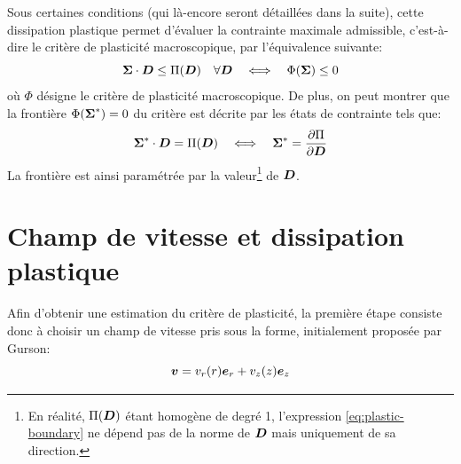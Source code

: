 \documentclass[french,12pt]{exam}
\begin{document}
Sous certaines conditions (qui là-encore seront détaillées dans la suite), cette dissipation plastique permet d'évaluer la contrainte maximale admissible, c'est-à-dire le critère de plasticité macroscopique, par l'équivalence suivante:
\begin{equation}
  \boldsymbol{\Sigma} \cdot \boldsymbol{D} \leq \Pi(\boldsymbol{D}) \quad \forall \boldsymbol{D} \quad \Longleftrightarrow \quad \Phi(\boldsymbol{\Sigma}) \leq 0 \label{eq2}
\end{equation}
où $\Phi$ désigne le critère de plasticité macroscopique. De plus, on peut montrer que la frontière $\Phi(\boldsymbol{\Sigma}^*)=0$ du critère est décrite par les états de contrainte tels que:
\begin{equation}
\boldsymbol{\Sigma}^*\cdot\boldsymbol{D} = \Pi(\boldsymbol{D}) \quad \Longleftrightarrow \quad \boldsymbol{\Sigma}^* = \dfrac{\partial \Pi}{\partial \boldsymbol{D}}
  \label{eq:plastic-boundary}
\end{equation}
La frontière est ainsi paramétrée par la valeur\footnote{En réalité, $\Pi(\boldsymbol{D})$ étant homogène de degré 1, l'expression \eqref{eq:plastic-boundary} ne dépend pas de la norme de $\boldsymbol{D}$ mais uniquement de sa direction.} de $\boldsymbol{D}$.

\section{Champ de vitesse et dissipation plastique}

Afin d'obtenir une estimation du critère de plasticité, la première étape consiste donc à choisir un champ de vitesse pris sous la forme, initialement proposée par Gurson:
\begin{equation}
  \boldsymbol{v} = v_r(r) \boldsymbol{e}_r + v_z(z) \boldsymbol{e}_z \label{eq:champ-vitesse}
\end{equation}
\end{document}

